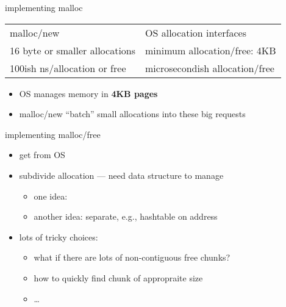 \begin{frame}{implementing malloc}
\begin{tabular}{ll}
malloc/new & OS allocation interfaces \\
16 byte or smaller allocations & minimum allocation/free: 4KB \\
100ish ns/allocation or free & microsecondish allocation/free \\
\end{tabular}
\begin{itemize}
\item OS manages memory in \textbf{4KB pages}
\item malloc/new ``batch'' small allocations into these big requests
\end{itemize}
\end{frame}

\begin{frame}{implementing malloc/free}
\begin{itemize}
    \item get  from OS
    \item subdivide allocation --- need data structure to manage
    \begin{itemize}
        \item one idea: 
        \item another idea: separate, e.g., hashtable on address
    \end{itemize} 
    \item lots of tricky choices:
    \begin{itemize}
        \item what if there are lots of non-contiguous free chunks?
        \item how to quickly find chunk of appropraite size
        \item \ldots
    \end{itemize}
\end{itemize}
\end{frame}


